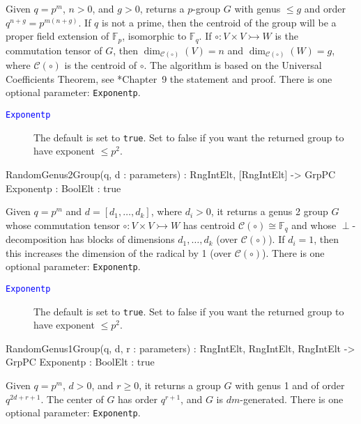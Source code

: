 \documentclass{documentation}
\begin{document}
Given $q=p^m$, $n>0$, and $g>0$, returns a $p$-group $G$ with genus $\leq g$ and order $q^{n+g}=p^{m(n+g)}$. 
If $q$ is not a prime, then the centroid of the group will be a proper field extension of $\mathbb{F}_p$, isomorphic to $\mathbb{F}_q$. 
If $\circ: V\times V\rightarrowtail W$ is the commutation tensor of $G$, then $\dim_{\mathcal{C}(\circ)}(V)=n$ and $\dim_{\mathcal{C}(\circ)}(W)=g$, where $\mathcal{C}(\circ)$ is the centroid of $\circ$. 
The algorithm is based on the Universal Coefficients Theorem, see \cite{LGM:book}*{Chapter~9} the statement and proof.
There is one optional parameter: {\tt Exponentp}. 

\begin{description}
\item[\textcolor{blue}{\tt Exponentp}]
The default is set to {\tt true}.
Set to false if you want the returned group to have exponent $\leq p^2$.  
\end{description}

\begin{intrinsics}
RandomGenus2Group(q, d : parameters) : RngIntElt, [RngIntElt] -> GrpPC
    Exponentp : BoolElt : true
\end{intrinsics}

Given $q=p^m$ and $d=[d_1, \dots, d_k]$, where $d_i>0$, it returns a genus 2 group $G$ whose commutation tensor $\circ : V\times V\rightarrowtail W$ has centroid $\mathcal{C}(\circ)\cong \mathbb{F}_q$ and whose $\perp$-decomposition has blocks of dimensions $d_1,\dots,d_k$ (over $\mathcal{C}(\circ)$).
If $d_i=1$, then this increases the dimension of the radical by 1 (over $\mathcal{C}(\circ)$).
There is one optional parameter: {\tt Exponentp}. 

\begin{description}
\item[\textcolor{blue}{\tt Exponentp}]
The default is set to {\tt true}.
Set to false if you want the returned group to have exponent $\leq p^2$.  
\end{description}

\begin{intrinsics}
RandomGenus1Group(q, d, r : parameters) : RngIntElt, RngIntElt, RngIntElt -> GrpPC
    Exponentp : BoolElt : true
\end{intrinsics}

Given $q=p^m$, $d>0$, and $r\geq 0$, it returns a group $G$ with genus 1 and of order $q^{2d+r+1}$.
The center of $G$ has order $q^{r+1}$, and $G$ is $dm$-generated.
There is one optional parameter: {\tt Exponentp}. 
\end{document}
